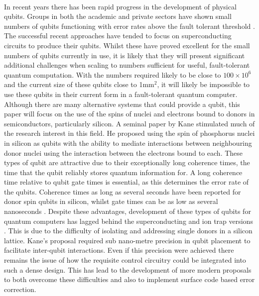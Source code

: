\\
In recent years there has been rapid progress in the development of physical qubits.
Groups in both the academic and private sectors have shown small numbers of qubits functioning with error rates above the fault tolerant threshold \cite{Barends2015,Reagor2017}.
The successful recent approaches have tended to focus on superconducting circuits to produce their qubits.
Whilst these have proved excellent for the small numbers of qubits currently in use, it is likely that they will present significant additional challenges when scaling to numbers sufficient for useful, fault-tolerant quantum computation.
With the numbers required likely to be close to $100 \times 10^6$ and the current size of these qubits close to 1mm$^2$, it will likely be impossible to use these qubits in their current form in a fault-tolerant quantum computer.
\\
Although there are many alternative systems that could provide a qubit, this paper will focus on the use of the spins of nuclei and electrons bound to donors in semiconductors, particularly silicon.
A seminal paper by Kane \cite{Kane1998} stimulated much of the research interest in this field.
He proposed using the spin of phosphorus nuclei in silicon as qubits with the ability to mediate interactions between neighbouring donor nuclei using the interaction between the electrons bound to each.
These types of qubit are attractive due to their exceptionally long coherence times, the time that the qubit reliably stores quantum information for. 
A long coherence time relative to qubit gate times is essential, as this determines the error rate of the qubits.
Coherence times as long as several seconds have been reported for donor spin qubits in silicon, whilst gate times can be as low as several nanoseconds \cite{Wolfowicz2013}. 
Despite these advantages, development of these types of qubits for quantum computers has lagged behind the superconducting and ion trap versions \cite{Ballance2015}. 
This is due to the difficulty of isolating and addressing single donors in a silicon lattice. 
Kane's proposal required sub nano-metre precision in qubit placement to facilitate inter-qubit interactions. 
Even if this precision were achieved there remains the issue of how the requisite control circuitry could be integrated into such a dense design.
This has lead to the development of more modern proposals to both overcome these difficulties and also to implement surface code based error correction.
\\
\\
